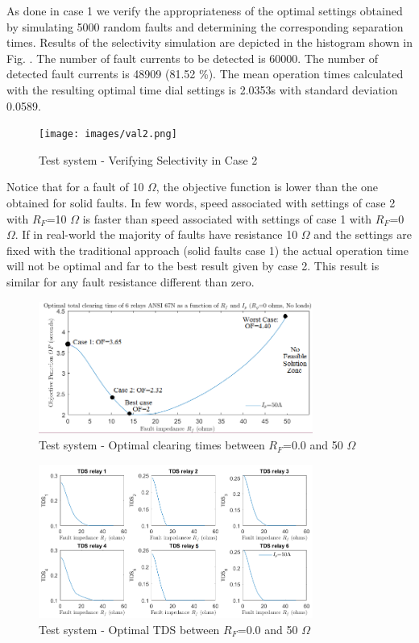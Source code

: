 \documentclass[letterpaper, 10 pt, conference]{IEEEtran}
\begin{document}
As done in case 1 we verify the appropriateness of the optimal settings obtained by simulating 5000 random faults and determining the corresponding separation times. Results of the selectivity simulation are depicted in the histogram shown in Fig. \label{figure6x}. The number of fault currents to be detected is 60000.
The number of detected fault currents is  48909 (81.52 \%). The mean operation times calculated with the resulting optimal time dial settings is  2.0353s with standard deviation
 0.0589.

 \begin{figure}[t!] \centerline{
     \texttt{[image: images/val2.png]}}
       \caption{Test system - Verifying Selectivity in Case 2}
      \label{figure6x}
        \end{figure}


Notice that for a fault of 10 $\Omega$, the objective function is lower than the one obtained for solid faults. In few words, speed associated with settings of case 2 with $R_F$=10 $\Omega$ is faster than speed associated with settings of case 1 with $R_F$=0  $\Omega$. If in real-world the majority of faults have resistance 10 $\Omega$ and the settings are fixed with the traditional approach (solid faults case 1) the actual operation time will not be optimal and far to the best result given by case 2. This result is similar for any fault resistance different than zero.


 \begin{figure}[t!] \centerline{
     \includegraphics[width=9cm]{images/OF.png}}
       \caption{Test system - Optimal clearing times between $R_F$=0.0 and 50 $\Omega$}
      \label{figure5}
        \end{figure}

         \begin{figure}[t!] \centerline{
     \includegraphics[width=9.0cm]{images/TDS.png}}
       \caption{Test system - Optimal TDS between $R_F$=0.0 and 50 $\Omega$}
      \label{figure6}
        \end{figure}
\end{document}

